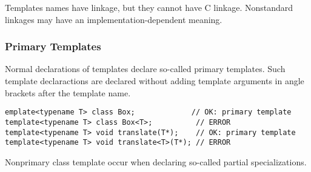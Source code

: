 \documentclass[11pt, a4paper]{book}
\begin{document}
Templates names have linkage, but they cannot have C linkage. Nonstandard linkages may have an implementation-dependent meaning.
\subsubsection{Primary Templates}
Normal declarations of templates declare so-called primary templates. Such template declaractions are declared without adding template arguments in angle brackets after the template name.
\begin{verbatim}
emplate<typename T> class Box;             // OK: primary template 
template<typename T> class Box<T>;          // ERROR 
template<typename T> void translate(T*);    // OK: primary template 
template<typename T> void translate<T>(T*); // ERROR 
\end{verbatim}

Nonprimary class template occur when declaring so-called partial specializations.
\end{document}
